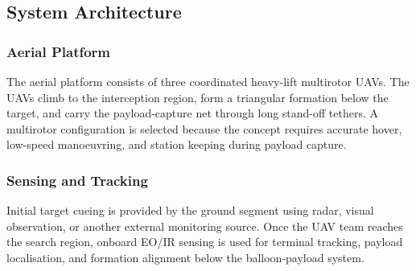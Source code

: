 






\subsection{System Architecture}
\label{subsec:concept_D_architecture}

\subsubsection{Aerial Platform}

The aerial platform consists of three coordinated heavy-lift multirotor UAVs. The UAVs climb to the interception region, form a triangular formation below the target, and carry the payload-capture net through long stand-off tethers. A multirotor configuration is selected because the concept requires accurate hover, low-speed manoeuvring, and station keeping during payload capture.

\subsubsection{Sensing and Tracking}

Initial target cueing is provided by the ground segment using radar, visual observation, or another external monitoring source. Once the UAV team reaches the search region, onboard EO/IR sensing is used for terminal tracking, payload localisation, and formation alignment below the balloon-payload system.

